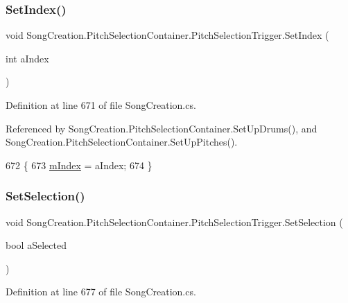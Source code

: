 \subsubsection{\texorpdfstring{Set\+Index()}{SetIndex()}}
{\footnotesize\ttfamily void Song\+Creation.\+Pitch\+Selection\+Container.\+Pitch\+Selection\+Trigger.\+Set\+Index (\begin{DoxyParamCaption}\item[{int}]{a\+Index }\end{DoxyParamCaption})}



Definition at line 671 of file Song\+Creation.\+cs.



Referenced by Song\+Creation.\+Pitch\+Selection\+Container.\+Set\+Up\+Drums(), and Song\+Creation.\+Pitch\+Selection\+Container.\+Set\+Up\+Pitches().


\begin{DoxyCode}
672             \{
673                 \hyperlink{class_song_creation_1_1_pitch_selection_container_1_1_pitch_selection_trigger_a6fa7a0883292035fef62858a69044010}{mIndex} = aIndex;
674             \}
\end{DoxyCode}
\mbox{\label{class_song_creation_1_1_pitch_selection_container_1_1_pitch_selection_trigger_a0eebfa085bd5326ed4cb4981cf02d2e0}} 
\subsubsection{\texorpdfstring{Set\+Selection()}{SetSelection()}}
{\footnotesize\ttfamily void Song\+Creation.\+Pitch\+Selection\+Container.\+Pitch\+Selection\+Trigger.\+Set\+Selection (\begin{DoxyParamCaption}\item[{bool}]{a\+Selected }\end{DoxyParamCaption})}



Definition at line 677 of file Song\+Creation.\+cs.



